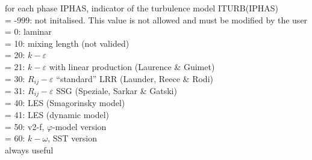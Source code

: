 {for each phase IPHAS, indicator of the turbulence model ITURB(IPHAS)\\
\hspace*{1.3cm}= -999: not initalised. This value is not allowed and
must be modified by the user\\ 
\hspace*{1.3cm}= 0: laminar\\
\hspace*{1.3cm}= 10: mixing length (not valided)\\
\hspace*{1.3cm}= 20: $k-\varepsilon$\\
\hspace*{1.3cm}= 21: $k-\varepsilon$ with linear production (Laurence \& Guimet)\\
\hspace*{1.3cm}= 30: $R_{ij}-\varepsilon$ ``standard'' LRR (Launder, Reece \& Rodi)\\
\hspace*{1.3cm}= 31: $R_{ij}-\varepsilon$ SSG (Speziale, Sarkar \& Gatski)\\
\hspace*{1.3cm}= 40: LES (Smagorinsky model) \\
\hspace*{1.3cm}= 41: LES (dynamic model) \\
\hspace*{1.3cm}= 50: v2-f, $\varphi$-model version\\
\hspace*{1.3cm}= 60: $k-\omega$, SST version \\
always useful}


